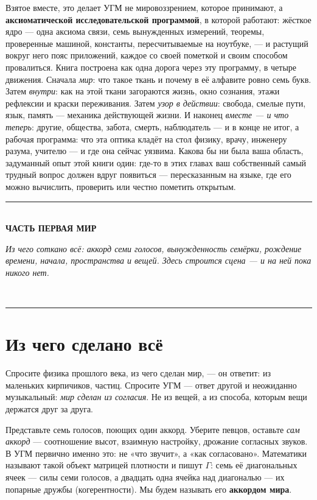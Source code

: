 \documentclass[11pt,letterpaper]{article}
\newcommand{\Gam}{\Gamma}
\newcommand{\partline}[2]{%
  \clearpage\vspace*{4pt}\begin{center}
  {\color{fact}\rule{0.55\textwidth}{0.4pt}}\\[9pt]
  {\large\bfseries #1}\\[7pt]
  \begin{minipage}{0.82\textwidth}\centering\small\itshape\color{plosgray} #2\end{minipage}\\[9pt]
  {\color{fact}\rule{0.55\textwidth}{0.4pt}}
  \end{center}\bigskip}
\begin{document}
Взятое вместе, это делает УГМ не мировоззрением, которое принимают,
а \textbf{аксиоматической исследовательской программой}, в которой
работают: жёсткое ядро --- одна аксиома связи, семь вынужденных
измерений, теоремы, проверенные машиной, константы, пересчитываемые
на ноутбуке, --- и растущий вокруг него пояс приложений, каждое со
своей пометкой и своим способом провалиться. Книга построена как
одна дорога через эту программу, в четыре движения. Сначала
\emph{мир}: что такое ткань и почему в её алфавите ровно семь букв.
Затем \emph{внутри}: как на этой ткани загораются жизнь, окно
сознания, этажи рефлексии и краски переживания. Затем \emph{узор в
действии}: свобода, смелые пути, язык, память --- механика
действующей жизни. И наконец \emph{вместе --- и что теперь}:
другие, общества, забота, смерть, наблюдатель --- и в конце не
итог, а рабочая программа: что эта оптика кладёт на стол физику,
врачу, инженеру разума, учителю --- и где она сейчас уязвима. Какова
бы ни была ваша область, задуманный опыт этой книги один: где-то в
этих главах ваш собственный самый трудный вопрос должен вдруг
появиться --- пересказанным на языке, где его можно вычислить,
проверить или честно пометить открытым.

\partline{ЧАСТЬ ПЕРВАЯ \;\textperiodcentered\; МИР}{Из чего соткано всё: аккорд семи голосов,
вынужденность семёрки, рождение времени, начала, пространства и вещей. Здесь строится сцена ---
и на ней пока никого нет.}

\section{Из чего сделано всё}
\label{sec:fabric}

Спросите физика прошлого века, из чего сделан мир, --- он ответит:
из маленьких кирпичиков, частиц. Спросите УГМ --- ответ другой и
неожиданно музыкальный: \emph{мир сделан из согласия}. Не из вещей,
а из способа, которым вещи держатся друг за друга.

Представьте семь голосов, поющих один аккорд. Уберите певцов, оставьте
\emph{сам аккорд} --- соотношение высот, взаимную настройку, дрожание
согласных звуков. В УГМ первично именно это: не «что звучит», а «как
согласовано». Математики называют такой объект матрицей плотности и пишут
$\Gam$: семь её диагональных ячеек --- силы семи голосов, а двадцать
одна ячейка над диагональю --- их попарные дружбы (когерентности).
Мы будем называть его \textbf{аккордом мира}.
\end{document}
